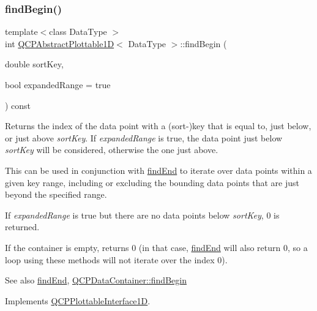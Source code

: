 \subsubsection{\texorpdfstring{findBegin()}{findBegin()}}
{\footnotesize\ttfamily template$<$class Data\+Type $>$ \\
int \mbox{\hyperlink{class_q_c_p_abstract_plottable1_d}{Q\+C\+P\+Abstract\+Plottable1D}}$<$ Data\+Type $>$\+::find\+Begin (\begin{DoxyParamCaption}\item[{double}]{sort\+Key,  }\item[{bool}]{expanded\+Range = {\ttfamily true} }\end{DoxyParamCaption}) const\hspace{0.3cm}{\ttfamily [virtual]}}





Returns the index of the data point with a (sort-\/)key that is equal to, just below, or just above {\itshape sort\+Key}. If {\itshape expanded\+Range} is true, the data point just below {\itshape sort\+Key} will be considered, otherwise the one just above.

This can be used in conjunction with \mbox{\hyperlink{class_q_c_p_abstract_plottable1_d_a6e3ba20c9160d7361e58070390d10b1a}{find\+End}} to iterate over data points within a given key range, including or excluding the bounding data points that are just beyond the specified range.

If {\itshape expanded\+Range} is true but there are no data points below {\itshape sort\+Key}, 0 is returned.

If the container is empty, returns 0 (in that case, \mbox{\hyperlink{class_q_c_p_abstract_plottable1_d_a6e3ba20c9160d7361e58070390d10b1a}{find\+End}} will also return 0, so a loop using these methods will not iterate over the index 0).

\begin{DoxySeeAlso}{See also}
\mbox{\hyperlink{class_q_c_p_abstract_plottable1_d_a6e3ba20c9160d7361e58070390d10b1a}{find\+End}}, \mbox{\hyperlink{class_q_c_p_data_container_a2ad8a5399072d99a242d3a6d2d7e278a}{Q\+C\+P\+Data\+Container\+::find\+Begin}} 
\end{DoxySeeAlso}


Implements \mbox{\hyperlink{class_q_c_p_plottable_interface1_d_a5b95783271306a4de97be54eac1e7d13}{Q\+C\+P\+Plottable\+Interface1D}}.

\mbox{\label{class_q_c_p_abstract_plottable1_d_a6e3ba20c9160d7361e58070390d10b1a}} 
